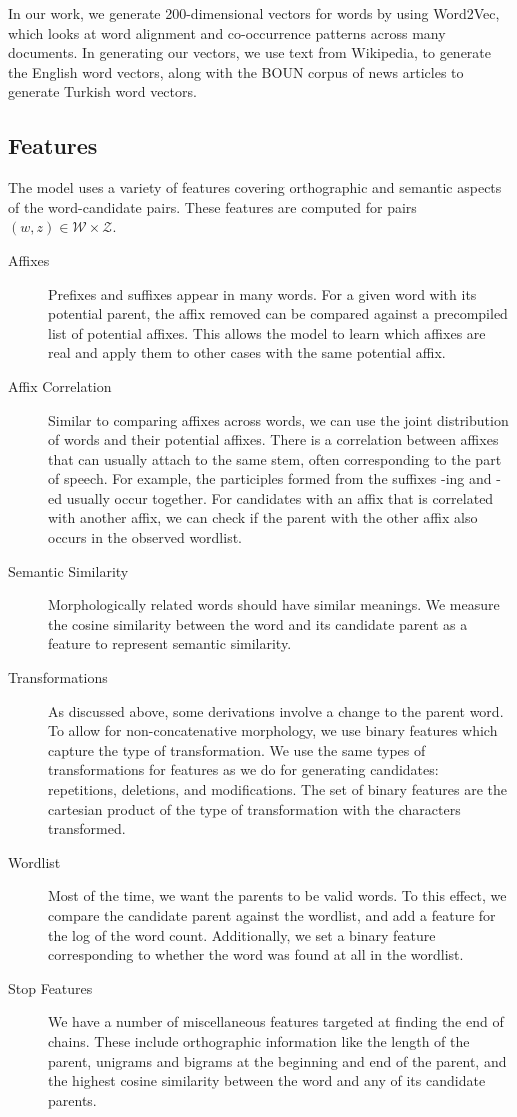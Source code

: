\documentclass[11pt,twocolumn]{article}
\begin{document}
In our work, we generate 200-dimensional vectors for words by using Word2Vec, which looks at word alignment  and co-occurrence patterns across many documents. In generating our vectors, we use text from Wikipedia,
to generate the English word vectors, along with the BOUN corpus of news articles to generate Turkish word vectors.

\subsection{Features}

The model uses a variety of features covering orthographic and semantic aspects of the word-candidate pairs. These features are computed for pairs $(w,z) \in \mathcal W \times \mathcal Z$.

\begin{description}
    \item[Affixes] Prefixes and suffixes appear in many words. For a given word with its potential parent, the affix removed can be compared against a precompiled list of potential affixes. This allows the model to learn which affixes are real and apply them to other cases with the same potential affix.
    \item[Affix Correlation] Similar to comparing affixes across words, we can use the joint distribution of words and their potential affixes. There is a correlation between affixes that can usually attach to the same stem, often corresponding to the part of speech. For example, the participles formed from the suffixes -ing and -ed usually occur together. For candidates with an affix that is correlated with another affix, we can check if the parent with the other affix also occurs in the observed wordlist.
    \item[Semantic Similarity] Morphologically related words should have similar meanings. We measure the cosine similarity between the word and its candidate parent as a feature to represent semantic similarity.
    \item[Transformations] As discussed above, some derivations involve a change to the parent word. To allow for non-concatenative morphology, we use binary features which capture the type of transformation. We use the same types of transformations for features as we do for generating candidates: repetitions, deletions, and modifications. The set of binary features are the cartesian product of the type of transformation with the characters transformed.
    \item[Wordlist] Most of the time, we want the parents to be valid words. To this effect, we compare the candidate parent against the wordlist, and add a feature for the log of the word count. Additionally, we set a binary feature corresponding to whether the word was found at all in the wordlist.
    \item[Stop Features] We have a number of miscellaneous features targeted at finding the end of chains. These include orthographic information like the length of the parent, unigrams and bigrams at the beginning and end of the parent, and the highest cosine similarity between the word and any of its candidate parents.
\end{description}
\end{document}
